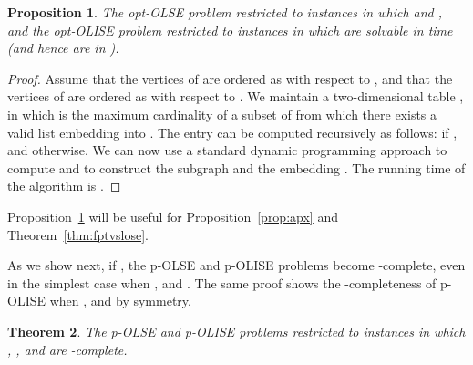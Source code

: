 \documentclass[11pt]{article}
\newtheorem{theorem}{Theorem}[section]
\newtheorem{proposition}[theorem]{Proposition}
\newcommand{\NP}{\mbox{}}
\begin{document}
\begin{proposition}\label{prop:noedges}
The opt-OLSE problem restricted to instances in which  and  , and the opt-OLISE problem restricted to instances in which  are solvable in  time (and hence are in ).
\end{proposition}

\begin{proof}
Assume that the vertices of  are ordered as  with respect to , and that the vertices of  are ordered as  with respect to .
We maintain a two-dimensional table , in which  is the maximum cardinality of a subset of  from which there exists a valid list embedding into . The entry  can be computed recursively as follows:  if , and  otherwise. We can now use a standard dynamic programming approach to compute  and to construct the subgraph  and the embedding . The running time of the algorithm is .
\end{proof}

Proposition~\ref{prop:noedges} will be useful for Proposition~\ref{prop:apx} and Theorem~\ref{thm:fptvslose}.

As we show next, if , the p-OLSE and p-OLISE problems become -complete, even in the simplest case when ,  and . The same proof shows the \NP-completeness
of p-OLISE when ,  and  by symmetry.


\begin{theorem}
The p-OLSE and p-OLISE problems restricted to instances in which , , and  are -complete.
\end{theorem}
\end{document}
